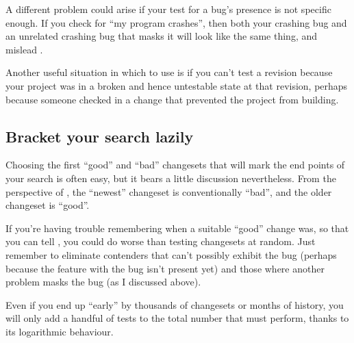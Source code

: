 A different problem could arise if your test for a bug's presence is
not specific enough.  If you check for ``my program crashes'', then
both your crashing bug and an unrelated crashing bug that masks it
will look like the same thing, and mislead .

Another useful situation in which to use  is
if you can't test a revision because your project was in a broken and
hence untestable state at that revision, perhaps because someone
checked in a change that prevented the project from building.

\subsection{Bracket your search lazily}

Choosing the first ``good'' and ``bad'' changesets that will mark the
end points of your search is often easy, but it bears a little
discussion nevertheless.  From the perspective of , the
``newest'' changeset is conventionally ``bad'', and the older
changeset is ``good''.

If you're having trouble remembering when a suitable ``good'' change
was, so that you can tell , you could do worse than
testing changesets at random.  Just remember to eliminate contenders
that can't possibly exhibit the bug (perhaps because the feature with
the bug isn't present yet) and those where another problem masks the
bug (as I discussed above).

Even if you end up ``early'' by thousands of changesets or months of
history, you will only add a handful of tests to the total number that
 must perform, thanks to its logarithmic behaviour.

